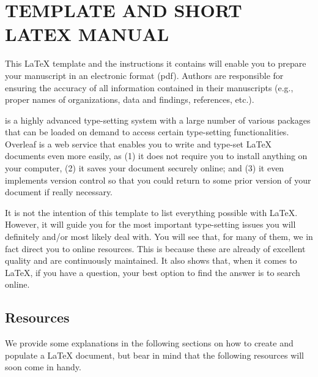
\chapter{\MakeUppercase{Template and short \LaTeX{} manual}} %
\label{cha:latex_manual}


This \LaTeX{} template and the instructions it contains will enable you to prepare your manuscript in an electronic format (pdf). 
Authors are responsible for ensuring the accuracy of all information contained in their manuscripts (e.g., proper names of organizations, data and findings, references, etc.).

 is a highly advanced type-setting system with a large number of various packages that can be loaded on demand to access certain type-setting functionalities.
Overleaf is a web service that enables you to write and type-set \LaTeX{} documents even more easily, as (1) it does not require you to install anything on your computer, (2) it saves your document securely online; and (3) it even implements version control so that you could return to some prior version of your document if really necessary.

It is not the intention of this template to list everything possible with \LaTeX. 
However, it will guide you for the most important type-setting issues you will definitely and/or most likely deal with.
You will see that, for many of them, we in fact direct you to online resources. This is because these are already of excellent quality and are continuously maintained. It also shows that, when it comes to \LaTeX{}, if you have a question, your best option to find the answer is to search online.


\section{Resources}
\label{sec:Resources}

We provide some explanations in the following sections on how to create and populate a \LaTeX{} document, 
but bear in mind that the following resources will soon come in handy.

